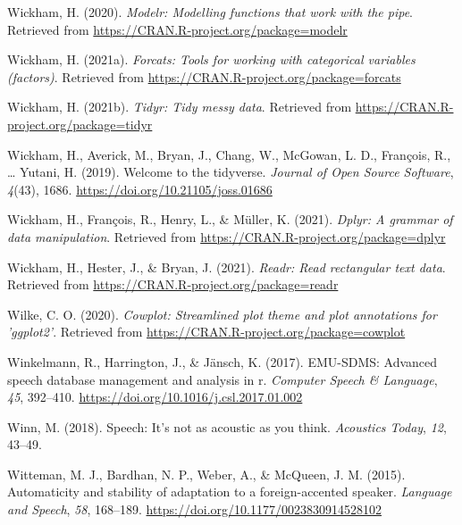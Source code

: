 \documentclass[
  11pt,
  english,
  man,floatsintext]{apa6}
\newlength{\cslhangindent}
\newlength{\cslentryspacingunit} %
\newenvironment{CSLReferences}[2] %
 {%
  \setlength{\parindent}{0pt}
  \ifodd #1
  \let\oldpar\par
  \def\par{\hangindent=\cslhangindent\oldpar}
  \fi
  \setlength{\parskip}{#2\cslentryspacingunit}
 }%
 {}
\begin{document}
\begin{CSLReferences}{1}{0}
\leavevmode{}%
Wickham, H. (2020). \emph{Modelr: Modelling functions that work with the pipe}. Retrieved from \url{https://CRAN.R-project.org/package=modelr}

\leavevmode{}%
Wickham, H. (2021a). \emph{Forcats: Tools for working with categorical variables (factors)}. Retrieved from \url{https://CRAN.R-project.org/package=forcats}

\leavevmode{}%
Wickham, H. (2021b). \emph{Tidyr: Tidy messy data}. Retrieved from \url{https://CRAN.R-project.org/package=tidyr}

\leavevmode{}%
Wickham, H., Averick, M., Bryan, J., Chang, W., McGowan, L. D., François, R., \ldots{} Yutani, H. (2019). Welcome to the {tidyverse}. \emph{Journal of Open Source Software}, \emph{4}(43), 1686. \url{https://doi.org/10.21105/joss.01686}

\leavevmode{}%
Wickham, H., François, R., Henry, L., \& Müller, K. (2021). \emph{Dplyr: A grammar of data manipulation}. Retrieved from \url{https://CRAN.R-project.org/package=dplyr}

\leavevmode{}%
Wickham, H., Hester, J., \& Bryan, J. (2021). \emph{Readr: Read rectangular text data}. Retrieved from \url{https://CRAN.R-project.org/package=readr}

\leavevmode{}%
Wilke, C. O. (2020). \emph{Cowplot: Streamlined plot theme and plot annotations for 'ggplot2'}. Retrieved from \url{https://CRAN.R-project.org/package=cowplot}

\leavevmode{}%
Winkelmann, R., Harrington, J., \& Jänsch, K. (2017). EMU-SDMS: Advanced speech database management and analysis in r. \emph{Computer Speech \& Language}, \emph{45}, 392--410. \url{https://doi.org/10.1016/j.csl.2017.01.002}

\leavevmode{}%
Winn, M. (2018). Speech: It's not as acoustic as you think. \emph{Acoustics Today}, \emph{12}, 43--49.

\leavevmode{}%
Witteman, M. J., Bardhan, N. P., Weber, A., \& McQueen, J. M. (2015). Automaticity and stability of adaptation to a foreign-accented speaker. \emph{Language and Speech}, \emph{58}, 168--189. \url{https://doi.org/10.1177/0023830914528102}


\end{CSLReferences}
\end{document}
